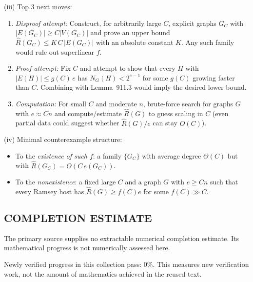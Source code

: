 (iii) Top 3 next moves:
\begin{enumerate}
\item \emph{Disproof attempt:} Construct, for arbitrarily large $C$, explicit graphs $G_C$ with $|E(G_C)|\ge C|V(G_C)|$ and prove an upper bound $\hat R(G_C)\le K\,C\,|E(G_C)|$ with an absolute constant $K$. Any such family would rule out superlinear $f$.
\item \emph{Proof attempt:} Fix $C$ and attempt to show that every $H$ with $|E(H)|\le g(C)\,e$ has $N_G(H)<2^{e-1}$ for some $g(C)$ growing faster than $C$. Combining with Lemma~911.3 would imply the desired lower bound.
\item \emph{Computation:} For small $C$ and moderate $n$, brute-force search for graphs $G$ with $e\approx Cn$ and compute/estimate $\hat R(G)$ to guess scaling in $C$ (even partial data could suggest whether $\hat R(G)/e$ can stay $O(C)$).
\end{enumerate}

(iv) Minimal counterexample structure:
\begin{itemize}
\item To the \emph{existence of such $f$}: a family $\{G_C\}$ with average degree $\Theta(C)$ but with $\hat R(G_C)=O(C\,e(G_C))$.
\item To the \emph{nonexistence}: a fixed large $C$ and a graph $G$ with $e\ge Cn$ such that every Ramsey host has $\hat R(G)\ge f(C)e$ for some $f(C)\gg C$.
\end{itemize}




\subsection*{COMPLETION ESTIMATE}
The primary source supplies no extractable numerical completion estimate. Its mathematical progress is not numerically assessed here.

Newly verified progress in this collection pass: $0\%$. This measures new verification work, not the amount of mathematics achieved in the reused text.
